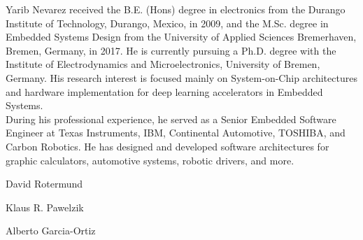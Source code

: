 \begin{IEEEbiography}{Yarib Nevarez} received the B.E. (Hons) degree in electronics from the Durango Institute of Technology, Durango, Mexico, in 2009, and the M.Sc. degree in Embedded Systems Design from the University of Applied Sciences Bremerhaven, Bremen, Germany, in 2017. He is currently pursuing a Ph.D. degree with the Institute of Electrodynamics and Microelectronics, University of Bremen, Germany. His research interest is focused mainly on System-on-Chip architectures and hardware implementation for deep learning accelerators in Embedded Systems.
\\
During his professional experience, he served as a Senior Embedded Software Engineer at Texas Instruments, IBM, Continental Automotive, TOSHIBA, and Carbon Robotics. He has designed and developed software architectures for graphic calculators, automotive systems, robotic drivers, and more.
	
\end{IEEEbiography}

\begin{IEEEbiography}{David Rotermund}
\end{IEEEbiography}

\begin{IEEEbiography}{Klaus R. Pawelzik}
\end{IEEEbiography}

\begin{IEEEbiography}{Alberto Garcia-Ortiz}
\end{IEEEbiography}
